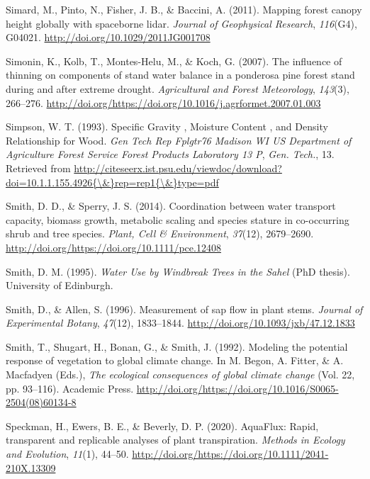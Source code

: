 \documentclass[11pt,twoside]{reedthesis}
\begin{document}
\hypertarget{ref-simard_mapping_2011}{}
Simard, M., Pinto, N., Fisher, J. B., \& Baccini, A. (2011). Mapping
forest canopy height globally with spaceborne lidar. \emph{Journal of
Geophysical Research}, \emph{116}(G4), G04021.
\url{http://doi.org/10.1029/2011JG001708}

\hypertarget{ref-simonin2007}{}
Simonin, K., Kolb, T., Montes-Helu, M., \& Koch, G. (2007). The
influence of thinning on components of stand water balance in a
ponderosa pine forest stand during and after extreme drought.
\emph{Agricultural and Forest Meteorology}, \emph{143}(3), 266--276.
\url{http://doi.org/https://doi.org/10.1016/j.agrformet.2007.01.003}

\hypertarget{ref-Simpson1993}{}
Simpson, W. T. (1993). Specific Gravity , Moisture Content , and Density
Relationship for Wood. \emph{Gen Tech Rep Fplgtr76 Madison WI US
Department of Agriculture Forest Service Forest Products Laboratory 13
P}, \emph{Gen. Tech.}, 13. Retrieved from
\href{http://citeseerx.ist.psu.edu/viewdoc/download?doi=10.1.1.155.4926\%7B/\&\%7Drep=rep1\%7B/\&\%7Dtype=pdf}{http://citeseerx.ist.psu.edu/viewdoc/download?doi=10.1.1.155.4926\{\textbackslash{}\&\}rep=rep1\{\textbackslash{}\&\}type=pdf}

\hypertarget{ref-Smith2014}{}
Smith, D. D., \& Sperry, J. S. (2014). Coordination between water
transport capacity, biomass growth, metabolic scaling and species
stature in co-occurring shrub and tree species. \emph{Plant, Cell \&
Environment}, \emph{37}(12), 2679--2690.
\url{http://doi.org/https://doi.org/10.1111/pce.12408}

\hypertarget{ref-Smith1995}{}
Smith, D. M. (1995). \emph{Water Use by Windbreak Trees in the Sahel}
(PhD thesis). University of Edinburgh.

\hypertarget{ref-Smith1996}{}
Smith, D., \& Allen, S. (1996). Measurement of sap flow in plant stems.
\emph{Journal of Experimental Botany}, \emph{47}(12), 1833--1844.
\url{http://doi.org/10.1093/jxb/47.12.1833}

\hypertarget{ref-Smith1992}{}
Smith, T., Shugart, H., Bonan, G., \& Smith, J. (1992). Modeling the
potential response of vegetation to global climate change. In M. Begon,
A. Fitter, \& A. Macfadyen (Eds.), \emph{The ecological consequences of
global climate change} (Vol. 22, pp. 93--116). Academic Press.
\url{http://doi.org/https://doi.org/10.1016/S0065-2504(08)60134-8}

\hypertarget{ref-Speckman2020}{}
Speckman, H., Ewers, B. E., \& Beverly, D. P. (2020). AquaFlux: Rapid,
transparent and replicable analyses of plant transpiration.
\emph{Methods in Ecology and Evolution}, \emph{11}(1), 44--50.
\url{http://doi.org/https://doi.org/10.1111/2041-210X.13309}
\end{document}
